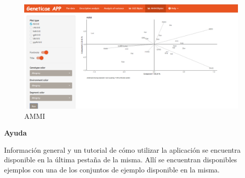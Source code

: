 \begin{figure}[H]
	\begin{center}
		\includegraphics[width=16cm]{./Graficos/AMMI_S.png}
	\end{center}
	\caption{AMMI}
	\label{fig:fig4313}
\end{figure}



\textbf{Ayuda}

Información general y un tutorial de cómo utilizar la aplicación se encuentra disponible en la última pestaña de la misma. Allí se encuentran disponibles ejemplos con una de los conjuntos de ejemplo disponible en la misma.  
